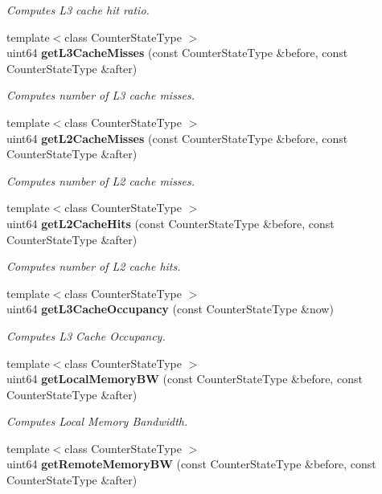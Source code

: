 \begin{DoxyCompactItemize}
\begin{DoxyCompactList}\small\item\em Computes L3 cache hit ratio. \end{DoxyCompactList}\item 
{\footnotesize template$<$class Counter\+State\+Type $>$ }\\uint64 {\bf get\+L3\+Cache\+Misses} (const Counter\+State\+Type \&before, const Counter\+State\+Type \&after)
\begin{DoxyCompactList}\small\item\em Computes number of L3 cache misses. \end{DoxyCompactList}\item 
{\footnotesize template$<$class Counter\+State\+Type $>$ }\\uint64 {\bf get\+L2\+Cache\+Misses} (const Counter\+State\+Type \&before, const Counter\+State\+Type \&after)
\begin{DoxyCompactList}\small\item\em Computes number of L2 cache misses. \end{DoxyCompactList}\item 
{\footnotesize template$<$class Counter\+State\+Type $>$ }\\uint64 {\bf get\+L2\+Cache\+Hits} (const Counter\+State\+Type \&before, const Counter\+State\+Type \&after)
\begin{DoxyCompactList}\small\item\em Computes number of L2 cache hits. \end{DoxyCompactList}\item 
{\footnotesize template$<$class Counter\+State\+Type $>$ }\\uint64 {\bf get\+L3\+Cache\+Occupancy} (const Counter\+State\+Type \&now)
\begin{DoxyCompactList}\small\item\em Computes L3 Cache Occupancy. \end{DoxyCompactList}\item 
{\footnotesize template$<$class Counter\+State\+Type $>$ }\\uint64 {\bf get\+Local\+Memory\+BW} (const Counter\+State\+Type \&before, const Counter\+State\+Type \&after)
\begin{DoxyCompactList}\small\item\em Computes Local Memory Bandwidth. \end{DoxyCompactList}\item 
{\footnotesize template$<$class Counter\+State\+Type $>$ }\\uint64 {\bf get\+Remote\+Memory\+BW} (const Counter\+State\+Type \&before, const Counter\+State\+Type \&after)

\end{DoxyCompactItemize}
